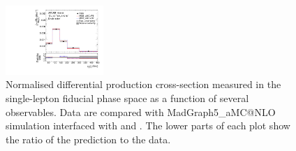 \begin{figure}[ht]
  \includegraphics[width=0.33\textwidth]{figures/diff_xsec/normalized-unfolded-distributions/tty_prod_ljet/SL_tty_prod_ptj1_unfolded_normalized.pdf}%
  \caption{Normalised differential \tty production cross-section measured in the single-lepton fiducial phase space as a function of several observables. Data are compared with MadGraph5\_aMC@NLO simulation interfaced with \PYTHIA[8] and \HERWIG[7]. The lower parts of each plot show the ratio of the prediction to the data.}
  \label{fig:tty_prod_diff_Ljets_norm}
\end{figure}
\FloatBarrier

